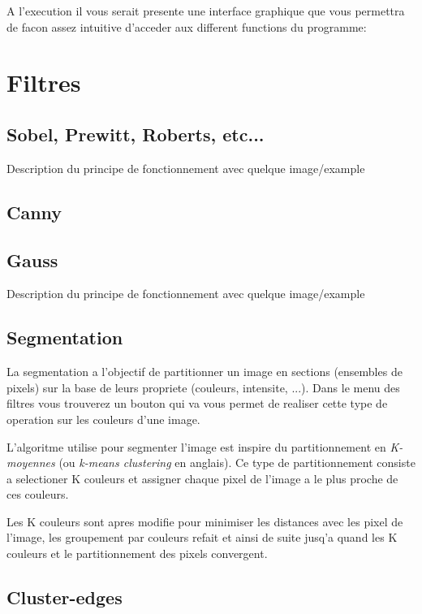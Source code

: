 \documentclass[twoside,openright,a4paper,11pt,french]{article}
\begin{document}
\vspace{1cm}
A l'execution il vous serait presente une interface graphique que vous
permettra de facon assez intuitive d'acceder aux different functions
du programme:

\begin{center}
\end{center}

\newpage 
\section{Filtres}
\subsection{Sobel, Prewitt, Roberts, etc...}
Description du principe de fonctionnement avec quelque image/example

\subsection{Canny}

\subsection{Gauss}
Description du principe de fonctionnement avec quelque image/example

\subsection{Segmentation}
La segmentation a l'objectif de partitionner un image en sections
(ensembles de pixels) sur la base de leurs propriete (couleurs,
intensite, ...). Dans le menu des filtres vous trouverez un bouton qui
va vous permet de realiser cette type de operation sur les couleurs
d'une image. 

L'algoritme utilise pour segmenter l'image est inspire du
partitionnement en {\it K-moyennes} (ou {\it k-means clustering} en
anglais). Ce type de partitionnement consiste a selectioner K couleurs
et assigner chaque pixel de l'image a le plus proche de ces couleurs.


Les K couleurs sont apres modifie pour minimiser les distances avec
les pixel de l'image, les groupement par couleurs refait et ainsi de
suite jusq'a quand les K couleurs et le partitionnement des pixels
convergent. 

\subsection{Cluster-edges}
\newpage
\end{document}
